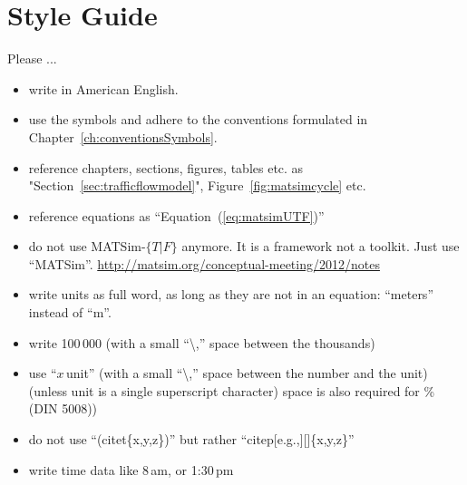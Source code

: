 



\section*{Style Guide}
\label{sec:styleguide}

Please ...

\begin{itemize}\styleItemize

\item write in American English.

\item use the symbols and adhere to the conventions formulated in Chapter~\ref{ch:conventionsSymbols}.

\item reference chapters, sections, figures, tables etc. as "Section~\ref{sec:trafficflowmodel}", Figure~\ref{fig:matsimcycle} etc.

\item reference equations as ``Equation~(\ref{eq:matsimUTF})''

\item do not use MATSim-$\{T\lvert F\}$ anymore. It is a framework not a toolkit. Just use ``MATSim''. \url{http://matsim.org/conceptual-meeting/2012/notes}

\item write units as full word, as long as they are not in an equation: ``meters'' instead of ``m''. 

\item write 100\,000 (with a small ``\textbackslash,'' space between the thousands)

\item use ``$x$\,unit'' (with a small ``\textbackslash,'' space between the number and the unit) (unless unit is a single superscript character) space is also required for \% (DIN 5008))

\item do not use ``(\eg citet\{x,y,z\})'' but rather ``citep[e.g.,][]\{x,y,z\}''

\item write time data like 8\,am, or 1:30\,pm


\end{itemize}
